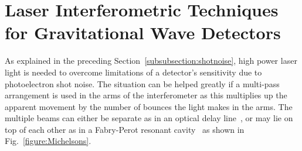 \documentclass{article}
\begin{document}
\newpage

\section{Laser Interferometric Techniques for Gravitational Wave Detectors}
\label{section:interferometry}

As explained in the preceding Section~\ref{subsubsection:shotnoise},
high power laser light is needed to overcome limitations of a detector's
sensitivity due to photoelectron shot noise. The situation can be helped greatly
if a multi-pass arrangement is used in the arms of the interferometer as this
multiplies up the apparent movement by the number of bounces the light makes in
the arms. The multiple beams can either be separate as in an optical delay
line~\cite{Weiss, Billing}, or may lie on top of each other as in a
Fabry-Perot resonant cavity~\cite{Drever2} as shown in
Fig.~\ref{figure:Michelsons}.
\end{document}

